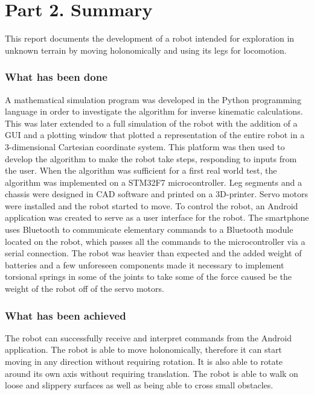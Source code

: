 \section*{Part 2. Summary}
\newpage
This report documents the development of a robot intended for exploration in unknown terrain by moving holonomically and using its legs for locomotion.\\

\subsubsection*{What has been done}
A mathematical simulation program was developed in the Python programming language in order to investigate the algorithm for inverse kinematic calculations. This was later extended to a full simulation of the robot with the addition of a GUI and a plotting window that plotted a representation of the entire robot in a 3-dimensional Cartesian coordinate system. This platform was then used to develop the algorithm to make the robot take steps, responding to inputs from the user. When the algorithm was sufficient for a first real world test, the algorithm was implemented on a STM32F7 microcontroller. Leg segments and a chassis were designed in CAD software and printed on a 3D-printer. Servo motors were installed and the robot started to move. To control the robot, an Android application was created to serve as a user interface for the robot. The smartphone uses Bluetooth to communicate elementary commands to a Bluetooth module located on the robot, which passes all the commands to the microcontroller via a serial connection. The robot was heavier than expected and the added weight of batteries and a few unforeseen components made it necessary to implement torsional springs in some of the joints to take some of the force caused be the weight of the robot off of the servo motors.\\

\subsubsection*{What has been achieved}
The robot can successfully receive and interpret commands from the Android application. The robot is able to move holonomically, therefore it can start moving in any direction without requiring rotation. It is also able to rotate around its own axis without requiring translation. The robot is able to walk on loose and slippery surfaces as well as being able to cross small obstacles.\\

